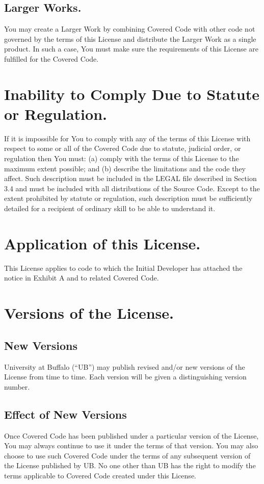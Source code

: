 \documentclass{book}
\begin{document}
\subsection{Larger Works.}
You may create a Larger Work by combining Covered Code with other code not governed by the terms of this License and distribute the Larger Work as a single product. In such a case, You must make sure the requirements of this License are fulfilled for the Covered Code. 


\section{Inability to Comply Due to Statute or Regulation.}
If it is impossible for You to comply with any of the terms of this License with respect to some or all of the Covered Code due to statute, judicial order, or regulation then You must: (a) comply with the terms of this License to the maximum extent possible; and (b) describe the limitations and the code they affect. Such description must be included in the LEGAL file described in Section 3.4 and must be included with all distributions of the Source Code. Except to the extent prohibited by statute or regulation, such description must be sufficiently detailed for a recipient of ordinary skill to be able to understand it. 

\section{Application of this License.}
This License applies to code to which the Initial Developer has attached the notice in Exhibit A and to related Covered Code. 

\section{Versions of the License.}
\subsection{New Versions}
University at Buffalo (``UB'') may publish revised and/or new versions of the License from time to time. Each version will be given a distinguishing version number. 

\subsection{Effect of New Versions}
Once Covered Code has been published under a particular version of the License, You may always continue to use it under the terms of that version. You may also choose to use such Covered Code under the terms of any subsequent version of the License published by UB. No one other than UB has the right to modify the terms applicable to Covered Code created under this License. 
\end{document}
